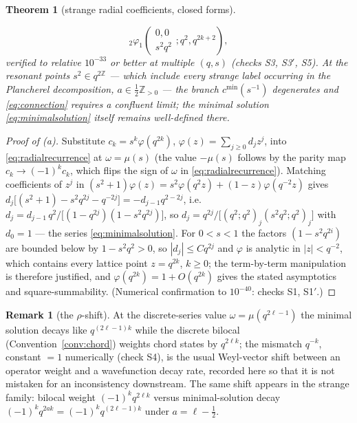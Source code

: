 \documentclass[11pt,a4paper]{article}
\theoremstyle{definition}
\newtheorem{remark}[definition]{Remark}
\theoremstyle{plain}
\newtheorem{theorem}[definition]{Theorem}
\newcommand{\Z}{\mathbb{Z}}
\begin{document}
\begin{theorem}[strange radial coefficients, closed forms]
\begin{enumerate}[label=(\alph*)]
\begin{equation}
  {}_{2}\varphi_{1}\!\left(\begin{matrix}0,0\\ s^{2}q^{2}\end{matrix};q^{2},q^{2k+2}\right),
\end{equation}
verified to relative $10^{-33}$ or better at multiple $(q,s)$ (checks S3, S3$'$, S5). At the
\emph{resonant} points $s^{2}\in q^{2\Z}$ --- which include every strange label occurring in the
Plancherel decomposition, $a\in\tfrac12\Z_{>0}$ --- the branch $c^{\mathrm{min}}(s^{-1})$
degenerates and \eqref{eq:connection} requires a confluent limit; the minimal solution
\eqref{eq:minimalsolution} itself remains well-defined there.
\end{enumerate}
\end{theorem}

\begin{proof}[Proof of (a)]
Substitute $c_{k}=s^{k}\varphi(q^{2k})$, $\varphi(z)=\sum_{j\ge0}d_{j}z^{j}$, into
\eqref{eq:radialrecurrence} at $\omega=\mu(s)$ (the value $-\mu(s)$ follows by the parity map
$c_{k}\to(-1)^{k}c_{k}$, which flips the sign of $\omega$ in \eqref{eq:radialrecurrence}).
Matching coefficients of $z^{j}$ in $(s^{2}+1)\varphi(z)=s^{2}\varphi(q^{2}z)
+(1-z)\varphi(q^{-2}z)$ gives
$d_{j}\bigl[(s^{2}+1)-s^{2}q^{2j}-q^{-2j}\bigr]=-d_{j-1}q^{2-2j}$, i.e.\
$d_{j}=d_{j-1}\,q^{2}/\bigl[(1-q^{2j})(1-s^{2}q^{2j})\bigr]$, so
$d_{j}=q^{2j}/\bigl[(q^{2};q^{2})_{j}(s^{2}q^{2};q^{2})_{j}\bigr]$ with $d_{0}=1$ ---
the series \eqref{eq:minimalsolution}. For $0<s<1$ the factors $(1-s^{2}q^{2i})$ are bounded
below by $1-s^{2}q^{2}>0$, so $|d_{j}|\le C q^{2j}$ and $\varphi$ is analytic in
$|z|<q^{-2}$, which contains every lattice point $z=q^{2k}$, $k\ge0$; the term-by-term
manipulation is therefore justified, and $\varphi(q^{2k})=1+O(q^{2k})$ gives the stated
asymptotics and square-summability. (Numerical confirmation to $10^{-40}$: checks S1, S1$'$.)
\end{proof}

\begin{remark}[the $\rho$-shift]\label{rem:rhoshift}
At the discrete-series value $\omega=\mu(q^{2\ell-1})$ the minimal solution decays like
$q^{(2\ell-1)k}$ while the discrete bilocal (Convention~\ref{conv:chord}) weights chord states
by $q^{2\ell k}$; the mismatch $q^{-k}$, constant $=1$ numerically (check S4), is the usual
Weyl-vector shift between an operator weight and a wavefunction decay rate, recorded here so
that it is not mistaken for an inconsistency downstream. The same shift appears in the strange
family: bilocal weight $(-1)^{k}q^{2\ell k}$ versus minimal-solution decay
$(-1)^{k}q^{2ak}=(-1)^{k}q^{(2\ell-1)k}$ under $a=\ell-\tfrac12$.
\end{remark}
\end{document}
